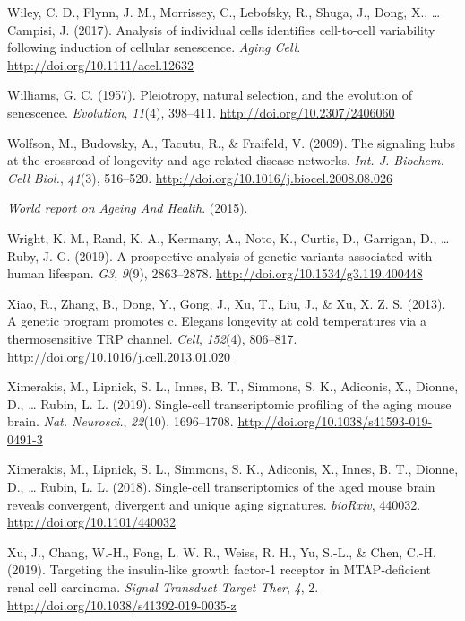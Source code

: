 \documentclass[12pt,twoside]{unicam}
\begin{document}
\begin{cslreferences}
\leavevmode\hypertarget{ref-Wiley2017}{}%
Wiley, C. D., Flynn, J. M., Morrissey, C., Lebofsky, R., Shuga, J., Dong, X., \ldots{} Campisi, J. (2017). Analysis of individual cells identifies cell-to-cell variability following induction of cellular senescence. \emph{Aging Cell}. \url{http://doi.org/10.1111/acel.12632}

\leavevmode\hypertarget{ref-Williams1957}{}%
Williams, G. C. (1957). Pleiotropy, natural selection, and the evolution of senescence. \emph{Evolution}, \emph{11}(4), 398--411. \url{http://doi.org/10.2307/2406060}

\leavevmode\hypertarget{ref-Wolfson2009}{}%
Wolfson, M., Budovsky, A., Tacutu, R., \& Fraifeld, V. (2009). The signaling hubs at the crossroad of longevity and age-related disease networks. \emph{Int. J. Biochem. Cell Biol.}, \emph{41}(3), 516--520. \url{http://doi.org/10.1016/j.biocel.2008.08.026}

\leavevmode\hypertarget{ref-WHO2015}{}%
\emph{World report on Ageing And Health}. (2015).

\leavevmode\hypertarget{ref-Wright2019}{}%
Wright, K. M., Rand, K. A., Kermany, A., Noto, K., Curtis, D., Garrigan, D., \ldots{} Ruby, J. G. (2019). A prospective analysis of genetic variants associated with human lifespan. \emph{G3}, \emph{9}(9), 2863--2878. \url{http://doi.org/10.1534/g3.119.400448}

\leavevmode\hypertarget{ref-Xiao2013}{}%
Xiao, R., Zhang, B., Dong, Y., Gong, J., Xu, T., Liu, J., \& Xu, X. Z. S. (2013). A genetic program promotes c. Elegans longevity at cold temperatures via a thermosensitive TRP channel. \emph{Cell}, \emph{152}(4), 806--817. \url{http://doi.org/10.1016/j.cell.2013.01.020}

\leavevmode\hypertarget{ref-Ximerakis2019}{}%
Ximerakis, M., Lipnick, S. L., Innes, B. T., Simmons, S. K., Adiconis, X., Dionne, D., \ldots{} Rubin, L. L. (2019). Single-cell transcriptomic profiling of the aging mouse brain. \emph{Nat. Neurosci.}, \emph{22}(10), 1696--1708. \url{http://doi.org/10.1038/s41593-019-0491-3}

\leavevmode\hypertarget{ref-Ximerakis2018}{}%
Ximerakis, M., Lipnick, S. L., Simmons, S. K., Adiconis, X., Innes, B. T., Dionne, D., \ldots{} Rubin, L. L. (2018). Single-cell transcriptomics of the aged mouse brain reveals convergent, divergent and unique aging signatures. \emph{bioRxiv}, 440032. \url{http://doi.org/10.1101/440032}

\leavevmode\hypertarget{ref-Xu2019}{}%
Xu, J., Chang, W.-H., Fong, L. W. R., Weiss, R. H., Yu, S.-L., \& Chen, C.-H. (2019). Targeting the insulin-like growth factor-1 receptor in MTAP-deficient renal cell carcinoma. \emph{Signal Transduct Target Ther}, \emph{4}, 2. \url{http://doi.org/10.1038/s41392-019-0035-z}


\end{cslreferences}
\end{document}
